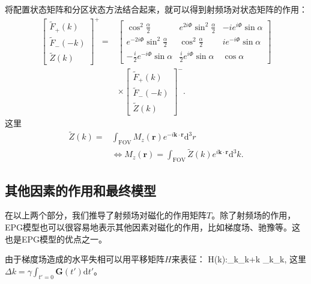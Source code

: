 将配置状态矩阵和分区状态方法结合起来，就可以得到射频场对状态矩阵的作用：
 \begin{align}
 \left[
  \begin{matrix}
   \tilde{F}_+(k) \\
   \tilde{F}_-(-k) \\
   \tilde{Z}(k)
   \end{matrix}
   \right]^+
   =&
   \left[
  \begin{matrix}
   \cos^2\frac{\alpha}{2} & e^{2i\Phi}\sin^2\frac{\alpha}{2} & -ie^{i\Phi}\sin\alpha \\
   e^{-2i\Phi}\sin^2\frac{\alpha}{2} & \cos^2\frac{\alpha}{2} & ie^{-i\Phi}\sin\alpha \\
   -\frac{i}{2}e^{-i\Phi}\sin\alpha & \frac{i}{2}e^{i\Phi}\sin\alpha & \cos\alpha
   \end{matrix}
   \right]\nonumber \\
   & \times \left[
  \begin{matrix}
   \tilde{F}_+(k) \\
   \tilde{F}_-(-k) \\
   \tilde{Z}(k)
   \end{matrix}
   \right]^-.
 \end{align}
 这里
 \begin{align} 
 \tilde{Z}(k)=&\int_{\mathrm{FOV}}M_z(\textbf{r})e^{-i\textbf{k} \cdot \textbf{r}}\mathrm{d}^3r\nonumber\\ &\Longleftrightarrow
 M_z(\textbf{r})=\int_{\mathrm{FOV}}\tilde{Z}(k)e^{i\textbf{k} \cdot \textbf{r}}\mathrm{d}^3k.
 \end{align}
 
 \subsection{其他因素的作用和最终模型}
 在以上两个部分，我们推导了射频场对磁化的作用矩阵$T$。除了射频场的作用，EPG模型也可以很容易地表示其他因素对磁化的作用，比如梯度场、驰豫等。这也是EPG模型的优点之一。
 
 由于梯度场造成的水平失相可以用平移矩阵$H$来表征：
 \beq H(\Delta k):\quad{}_k\rightarrow{}_{k+\Delta k} \quad{} \quad {}_k\rightarrow{}_k,\eeq 
 这里$\Delta k=\gamma\int_{t'=0}\textbf{G}(t')\mathrm{d}t'$。
 
